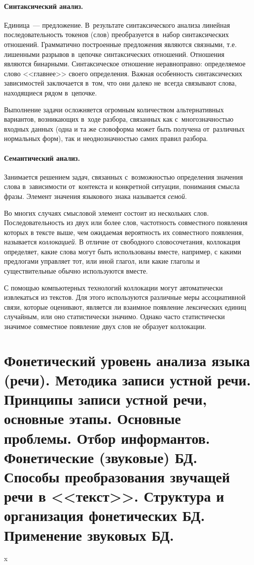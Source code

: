\documentclass[12pt]{article}
\theoremstyle{definition}
\theoremstyle{remark}
\numberwithin{equation}{section}
\begin{document}
\paragraph{Синтаксический анализ.} Единица~--- предложение.
В~результате синтаксического анализа линейная последовательность
токенов (слов) преобразуется в~набор синтаксических отношений. 
Грамматично построенные предложения являются связными, т.е. 
лишенными разрывов в~цепочке синтаксических отношений. Отношения 
являются бинарными. Синтаксическое отношение неравноправно: 
определяемое слово <<главнее>> своего определения. Важная 
особенность синтаксических зависимостей заключается в~том, 
что они далеко не~всегда связывают слова, находящиеся рядом 
в~цепочке.

Выполнение задачи осложняется огромным количеством альтернативных 
вариантов, возникающих в~ходе разбора, связанных как 
с~многозначностью входных данных (одна и та же словоформа может 
быть получена от~различных нормальных форм), так и неоднозначностью 
самих правил разбора.

\paragraph{Семантический анализ.} Занимается решением задач, 
связанных с~возможностью определения значения слова в~зависимости 
от~контекста и конкретной ситуации, понимания смысла фразы. 
Элемент значения языкового знака называется {\sl семой}.

Во многих случаях смысловой элемент состоит из нескольких слов.
Последовательность из двух или более слов, частотность совместного 
появления которых в тексте выше, чем ожидаемая вероятность их 
совместного появления, называется {\sl коллокацией}. В отличие 
от свободного словосочетания, коллокация определяет, какие слова 
могут быть использованы вместе, например, с какими предлогами 
управляет тот, или иной глагол, или какие глаголы и существительные 
обычно используются вместе.

С помощью компьютерных технологий коллокации могут автоматически 
извлекаться из текстов. Для этого используются различные меры 
ассоциативной связи, которые оценивают, является ли взаимное появление
лексических единиц случайным, или оно статистически значимо. Однако
часто статистически значимое совместное появление двух слов не образует
коллокации.

\section{Фонетический уровень анализа языка (речи). Методика записи устной речи. Принципы записи устной речи, основные этапы. Основные проблемы. Отбор информантов. Фонетические (звуковые) БД. Способы преобразования звучащей речи в <<текст>>. Структура и организация фонетических БД. Применение звуковых БД.}
x
\end{document}

